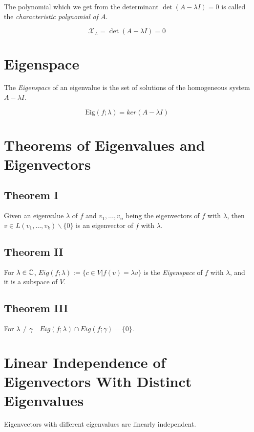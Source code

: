 The polynomial which we get from the determinant \(\det (A - \lambda I)  = 0\) is called 
the \emph{characteristic polynomial of \(A\)}.

\[
    \mathcal{X}_A = \det (A - \lambda I) = 0
\]

\section{Eigenspace}

The \emph{Eigenspace} of an eigenvalue is the set of solutions of the homogeneous system \(A - \lambda I\).

\[
    \mathrm{Eig}(f;\lambda) = ker(A - \lambda I)
\]

\section{Theorems of Eigenvalues and Eigenvectors}

\subsection{Theorem I}

Given an eigenvalue \(\lambda\) of \(f\) and \(v_1, \dots, v_n\) being the eigenvectors of \(f\) 
with \(\lambda\), then \(v \in L(v_1, \dots, v_k) \backslash \{0\}\) is an eigenvector of 
\(f\) with \(\lambda\).

\subsection{Theorem II}

For \(\lambda \in \mathbb{C}\), \(Eig(f;\lambda):= \{c \in V | f(v) = \lambda v\}\) is the \emph{Eigenspace} of 
\(f\) with \(\lambda\), and it is a subspace of \(V\).

\subsection{Theorem III}

For \(\lambda \ne \gamma \quad Eig(f;\lambda) \cap Eig(f;\gamma) = \{0\}\).

\section{Linear Independence of Eigenvectors With Distinct Eigenvalues}

Eigenvectors with different eigenvalues are linearly independent.

